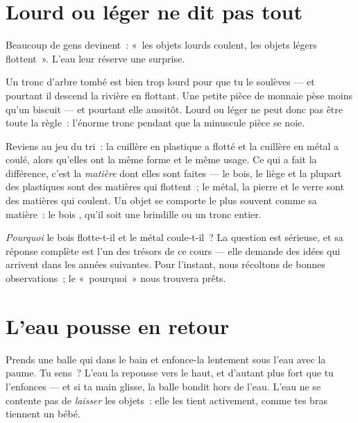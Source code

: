 \section{Lourd ou léger ne dit pas tout}

Beaucoup de gens devinent~: «~les objets lourds coulent, les objets
légers flottent~». L'eau leur réserve une surprise.

\begin{example}\label{ex:g1:floating-and-sinking:log}
Un tronc d'arbre tombé est bien trop lourd pour que tu le soulèves
--- et pourtant il descend la rivière en flottant. Une petite pièce
de monnaie pèse moins qu'un biscuit --- et pourtant elle  aussitôt.
Lourd ou léger ne peut donc pas être toute la règle~: l'énorme tronc
 pendant que la minuscule pièce se noie.
\end{example}

\begin{example}\label{ex:g1:floating-and-sinking:stuff}
Reviens au jeu du tri~: la cuillère en plastique a flotté et la
cuillère en métal a coulé, alors qu'elles ont la même forme et le
même usage. Ce qui a fait la différence, c'est la \emph{matière} dont
elles sont faites --- le bois, le liège et la plupart des plastiques
sont des matières qui flottent~; le métal, la pierre et le verre sont
des matières qui coulent. Un objet se comporte le plus souvent comme
sa matière~: le bois , qu'il soit une brindille ou un tronc
entier.
\end{example}

\begin{remark}\label{rem:g1:floating-and-sinking:why}
\emph{Pourquoi} le bois flotte-t-il et le métal coule-t-il~? La
question est sérieuse, et sa réponse complète est l'un des trésors de
ce cours --- elle demande des idées qui arrivent dans les années
suivantes. Pour l'instant, nous récoltons de bonnes observations~; le
«~pourquoi~» nous trouvera prêts.
\end{remark}

\section{L'eau pousse en retour}

\begin{example}\label{ex:g1:floating-and-sinking:push}
Prends une balle qui  dans le bain et enfonce-la lentement sous
l'eau avec la paume. Tu sens~? L'eau la repousse vers le haut, et
d'autant plus fort que tu l'enfonces --- et si ta main glisse, la
balle bondit hors de l'eau. L'eau ne se contente pas de
\emph{laisser}  les objets~: elle les tient activement, comme
tes bras tiennent un bébé.
\end{example}

